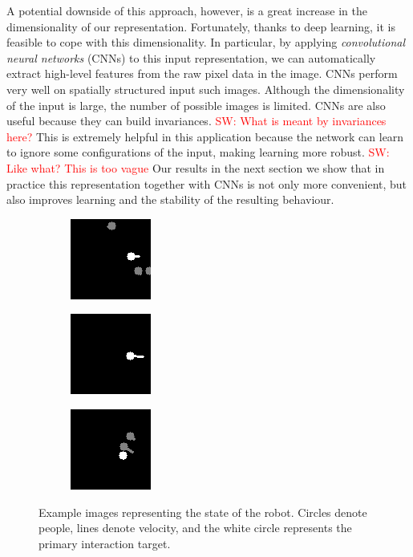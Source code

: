 \documentclass[letterpaper, 10 pt, conference]{ieeeconf}
\newcommand{\sw}[1]{\textcolor{red}{SW: #1}}
\begin{document}
A potential downside of this approach, however, is a great increase in the dimensionality of our representation.  Fortunately, thanks to deep learning, it is feasible to cope with this dimensionality.  In particular, by applying \emph{convolutional neural networks} (CNNs) to this input representation, we can automatically extract high-level features from the raw pixel data in the image. CNNs perform very well on spatially structured input such images.  Although the  dimensionality of the input is large, the number of possible images is limited. CNNs are also  useful because they can build invariances. \sw{What is meant by invariances here?} This is extremely helpful in this application because the network can learn to ignore some configurations of the input, making learning more robust. \sw{Like what? This is too vague} Our results in the next section we show that in practice this representation together with CNNs is not only more convenient, but also improves learning and the stability of the resulting behaviour.

  	\begin{figure}[tbh]
  	\centering
      \begin{subfigure}[b]{0.30\columnwidth}
    \includegraphics[scale = 0.80]{images/state1.png}
    \label{fig:state1}
  \end{subfigure}
  \begin{subfigure}[b]{0.30\columnwidth}
    \includegraphics[scale = 0.80]{images/state2.png}
       \label{fig:state2}
  \end{subfigure} 
    \begin{subfigure}[b]{0.30\columnwidth}
    \includegraphics[scale = 0.80]{images/state3.png}
       \label{fig:state3}
  \end{subfigure}
  \caption{Example images representing the state of the robot. Circles denote people, lines denote velocity, and the white circle represents the primary interaction target.}

    \vspace{-2mm}
  \label{fig:state}
  \end{figure}
\end{document}

